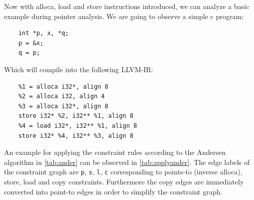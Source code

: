 Now with alloca, load and store instructions introduced, we can analyze a basic example during pointer analysis.
We are going to observe a simple c program:
\begin{verbatim}
    int *p, x, *q;
    p = &x;
    q = p;
\end{verbatim}
Which will compile into the following LLVM-IR:
\begin{verbatim}
    %1 = alloca i32*, align 8
    %2 = alloca i32, align 4
    %3 = alloca i32*, align 8
    store i32* %2, i32** %1, align 8
    %4 = load i32*, i32** %1, align 8
    store i32* %4, i32** %3, align 8
\end{verbatim}
An example for applying the constraint rules according to the Andersen algorithm in \autoref{tab:ander} can be observed in \autoref{tab:applyander}.
The edge labels of the constraint graph are \verb|p|, \verb|s|, \verb|l|, \verb|c| corresponding to points-to (inverse alloca), store, load and copy constraints.
Furthermore the copy edges are immediately converted into point-to edges in order to simplify the constraint graph.

